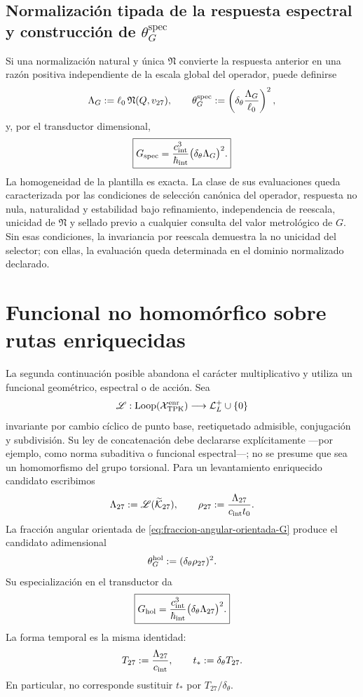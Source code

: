 \subsection{Normalización tipada de la respuesta espectral y construcción de \texorpdfstring{\(\theta_G^{\mathrm{spec}}\)}{theta G spec}}

Si una normalización natural y única \(\mathfrak N\) convierte la respuesta
anterior en una razón positiva independiente de la escala global del
operador, puede definirse
\[
 \Lambda_G
 :=\ell_0\,\mathfrak N(Q,v_{27}),
 \qquad
 \theta_G^{\rm spec}
 :=
 \left(
 \delta_\theta\frac{\Lambda_G}{\ell_0}
 \right)^2,
\]
y, por el transductor dimensional,
\[
 \boxed{
 G_{\rm spec}
 =
 \frac{c_{\rm int}^{3}}{\hbar_{\rm int}}
 \bigl(\delta_\theta\Lambda_G\bigr)^2.}
\]
La homogeneidad de la plantilla es exacta. La clase de sus evaluaciones queda
caracterizada por las condiciones de selección canónica del operador,
respuesta no nula, naturalidad y estabilidad bajo refinamiento, independencia
de reescala, unicidad de \(\mathfrak N\) y sellado previo a cualquier consulta
del valor metrológico de \(G\). Sin esas condiciones, la invariancia por
reescala demuestra la no unicidad del selector; con ellas, la evaluación queda
determinada en el dominio normalizado declarado.

\section{Funcional no homomórfico sobre rutas enriquecidas}
\label{sec:funcional-longitud-K27-G}

La segunda continuación posible abandona el carácter multiplicativo y utiliza
un funcional geométrico, espectral o de acción. Sea
\[
 \mathscr L:
 \operatorname{Loop}(\mathcal X_{\rm TPK}^{\rm enr})
 \longrightarrow\mathcal L_L^+\cup\{0\}
\]
invariante por cambio cíclico de punto base, reetiquetado admisible,
conjugación y subdivisión. Su ley de concatenación debe declararse
explícitamente ---por ejemplo, como norma subaditiva o funcional espectral---;
no se presume que sea un homomorfismo del grupo torsional. Para un
levantamiento enriquecido candidato escribimos
\[
 \Lambda_{27}:=\mathscr L(\widetilde{\mathcal K}_{27}),
 \qquad
 \rho_{27}:=\frac{\Lambda_{27}}{c_{\rm int}t_0}.
\]
La fracción angular orientada de
\eqref{eq:fraccion-angular-orientada-G} produce el candidato adimensional
\[
 \theta_G^{\rm hol}:=(\delta_\theta\rho_{27})^2.
\]
Su especialización en el transductor da
\[
 \boxed{
 G_{\rm hol}
 =\frac{c_{\rm int}^{3}}{\hbar_{\rm int}}
  \bigl(\delta_\theta\Lambda_{27}\bigr)^2.}
\]
La forma temporal es la misma identidad:
\[
 T_{27}:=\frac{\Lambda_{27}}{c_{\rm int}},
 \qquad
 t_\ast:=\delta_\theta T_{27}.
\]
En particular, no corresponde sustituir \(t_\ast\) por
\(T_{27}/\delta_\theta\).

